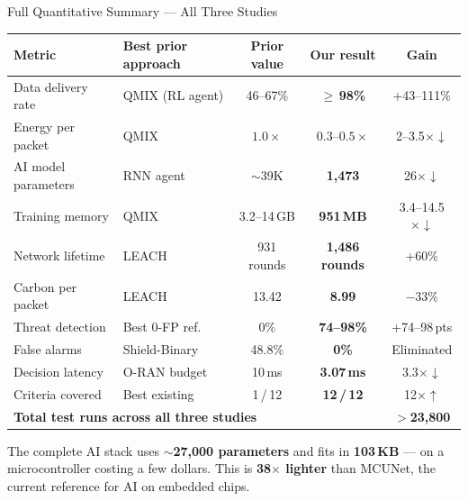 \documentclass[aspectratio=169,t,10pt]{beamer}
\begin{document}
\begin{frame}[shrink=15]{Full Quantitative Summary --- All Three Studies}
\centering\small
\renewcommand{\arraystretch}{1.2}
\begin{tabular}{@{}llccc@{}}
  \toprule
  \textbf{Metric} & \textbf{Best prior approach} & \textbf{Prior value}
    & \textbf{Our result} & \textbf{Gain} \\
  \midrule
  Data delivery rate  & QMIX (RL agent) & 46--67\%    & $\geq$\,\textbf{98\%}  & +43--111\% \\
  Energy per packet   & QMIX            & $1.0\times$ & $0.3$--$0.5\times$     & 2--3.5$\times\downarrow$ \\
  AI model parameters & RNN agent       & $\sim$39K   & \textbf{1,473}         & 26$\times\downarrow$ \\
  Training memory     & QMIX            & 3.2--14\,GB & \textbf{951\,MB}       & 3.4--14.5$\times\downarrow$ \\
  Network lifetime    & LEACH           & 931 rounds  & \textbf{1,486 rounds}  & +60\% \\
  Carbon per packet   & LEACH           & 13.42       & \textbf{8.99}          & $-$33\% \\
  Threat detection    & Best 0-FP ref.  & 0\%         & \textbf{74--98\%}      & +74--98\,pts \\
  False alarms        & Shield-Binary   & 48.8\%      & \textbf{0\%}           & Eliminated \\
  Decision latency    & O-RAN budget    & 10\,ms      & \textbf{3.07\,ms}      & 3.3$\times\downarrow$ \\
  Criteria covered    & Best existing   & 1\,/\,12    & \textbf{12\,/\,12}     & 12$\times\uparrow$ \\
  \midrule
  \multicolumn{4}{l}{\textbf{Total test runs across all three studies}}
    & \textbf{$>$23,800} \\
  \bottomrule
\end{tabular}
\vspace{5pt}
\begin{exampleblock}{}
  \centering\small
  The complete AI stack uses \textbf{$\sim$27,000 parameters} and fits in
  \textbf{103\,KB} --- on a microcontroller costing a few dollars.
  This is \textbf{38$\times$ lighter} than MCUNet,
  the current reference for AI on embedded chips.
\end{exampleblock}
\end{frame}
\end{document}

